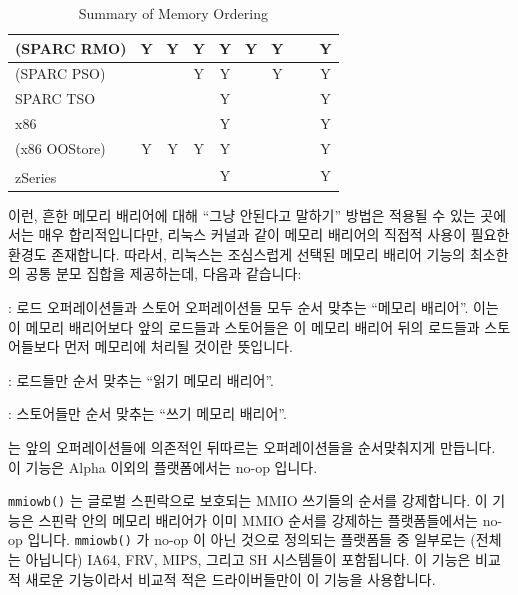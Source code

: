 \begin{table}
\begin{tabular}{l|c|c|c|c|c|c|c|c}
	\hline
	(SPARC RMO)	& Y & Y & Y & Y   & Y & Y & ~ & Y \\
	\hline
	(SPARC PSO)	& ~ & ~ & Y & Y   & ~ & Y & ~ & Y \\
	\hline
	SPARC TSO	& ~ & ~ & ~ & Y   & ~ & ~ & ~ & Y \\
	\hline
	x86		& ~ & ~ & ~ & Y   & ~ & ~ & ~ & Y \\
	\hline
	(x86 OOStore)	& Y & Y & Y & Y   & ~ & ~ & ~ & Y \\
	\hline
	zSeries\textsuperscript{\textregistered}
			& ~ & ~ & ~ & Y   & ~ & ~ & ~ & Y \\
\end{tabular}
\caption{Summary of Memory Ordering}
\label{tab:app:whymb:Summary of Memory Ordering}
\end{table}

이런, 흔한 메모리 배리어에 대해 ``그냥 안된다고 말하기'' 방법은 적용될 수 있는
곳에서는 매우 합리적입니다만, 리눅스 커널과 같이 메모리 배리어의 직접적 사용이
필요한 환경도 존재합니다.
따라서, 리눅스는 조심스럽게 선택된 메모리 배리어 기능의 최소한의 공통 분모
집합을 제공하는데, 다음과 같습니다:
\begin{description}
\item	{}: 로드 오퍼레이션들과 스토어 오퍼레이션들 모두 순서
	맞추는 ``메모리 배리어''.
	이는 이 메모리 배리어보다 앞의 로드들과 스토어들은 이 메모리 배리어
	뒤의 로드들과 스토어들보다 먼저 메모리에 처리될 것이란 뜻입니다.
\item	{}: 로드들만 순서 맞추는 ``읽기 메모리 배리어''.
\item	{}: 스토어들만 순서 맞추는 ``쓰기 메모리 배리어''.
\item	{} 는 앞의 오퍼레이션들에 의존적인
	뒤따르는 오퍼레이션들을 순서맞춰지게 만듭니다.
	이 기능은 Alpha 이외의 플랫폼에서는 no-op 입니다.
\item	{\tt mmiowb()} 는 글로벌 스핀락으로 보호되는 MMIO 쓰기들의 순서를
	강제합니다.
	이 기능은 스핀락 안의 메모리 배리어가 이미 MMIO 순서를 강제하는
	플랫폼들에서는 no-op 입니다.
	{\tt mmiowb()} 가 no-op 이 아닌 것으로 정의되는 플랫폼들 중 일부로는
	(전체는 아닙니다) IA64, FRV, MIPS, 그리고 SH 시스템들이 포함됩니다.
	이 기능은 비교적 새로운 기능이라서 비교적 적은 드라이버들만이 이 기능을
	사용합니다.
\end{description}
\iffalse

